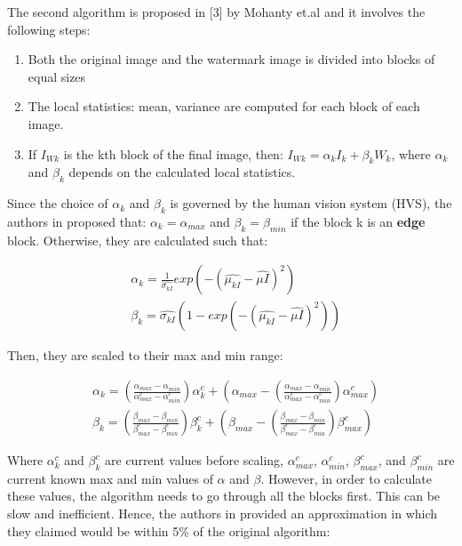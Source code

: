 \documentclass[letterpaper, 11pt]{article}
\begin{document}
	The second algorithm is proposed in [3] by Mohanty et.al and it involves the following steps:
	
	\begin{enumerate}
		\item Both the original image and the watermark image is divided into blocks of equal sizes
		\item The local statistics: mean, variance are computed for each block of each image.
		\item If $I_{Wk}$ is the kth block of the final image, then: $I_{Wk}=\alpha_k I_k + \beta_k W_k$, where $\alpha_k$ and $\beta_k$ depends on the calculated local statistics.
	\end{enumerate}
	
	Since the choice of $\alpha_k$ and $\beta_k$ is governed by the human vision system (HVS), the authors in \cite{3} proposed that: $\alpha_k=\alpha_{max}$ and $\beta_k=\beta_{min}$ if the block k is an \textbf{edge} block. Otherwise, they are calculated such that: 
	
	\begin{equation}
		\begin{aligned}
			& \alpha_k = \frac{1}{\hat{\sigma_{kI}}} exp(-(\hat{\mu_{kI}} - \hat{\mu{I}})^2) \\
			& \beta_k = \hat{\sigma_{kI}} (1 - exp(-(\hat{\mu_{kI}} - \hat{\mu{I}})^2))
		\end{aligned}
	\end{equation}
	
	Then, they are scaled to their max and min range:
	
	\begin{equation}
		\begin{aligned}
			& \alpha_k = (\frac{\alpha_{max} - \alpha_{min}}{\alpha^c_{max} - \alpha^c_{min}})\alpha^c_k + (\alpha_{max} - (\frac{\alpha_{max} - \alpha_{min}}{\alpha^c_{max} - \alpha^c_{min}})\alpha^c_{max}) \\
			& \beta_k = (\frac{\beta_{max} - \beta_{min}}{\beta^c_{max} - \beta^c_{min}})\beta^c_k + (\beta_{max} - (\frac{\beta_{max} - \beta_{min}}{\beta^c_{max} - \beta^c_{min}})\beta^c_{max})
		\end{aligned}
	\end{equation}
	
	Where $\alpha_k^c$ and $\beta_k^c$ are current values before scaling, $\alpha_{max}^c$, $\alpha_{min}^c$, $\beta_{max}^c$, and $\beta_{min}^c$ are current known max and min values of $\alpha$ and $\beta$. However, in order to calculate these values, the algorithm needs to go through all the blocks first. This can be slow and inefficient. Hence, the authors in \cite{1} provided an approximation in which they claimed would be within 5\% of the original algorithm:
	
\end{document}
